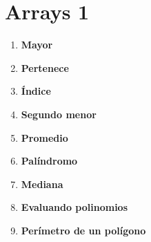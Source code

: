 \newpage
\section{Arrays 1}
\begin{enumerate}
    \item \textbf{Mayor}\\
    
    
    \item \textbf{Pertenece}\\
    
     
    \item \textbf{Índice}\\
    
     
    \item \textbf{Segundo menor}\\
    

    \item \textbf{Promedio}\\
    

    \item \textbf{Palíndromo}
    

    \item \textbf{Mediana}\\
    

    \item \textbf{Evaluando polinomios}\\
    
    
    \item \textbf{Perímetro de un polígono}\\
    
\end{enumerate}

\newpage
